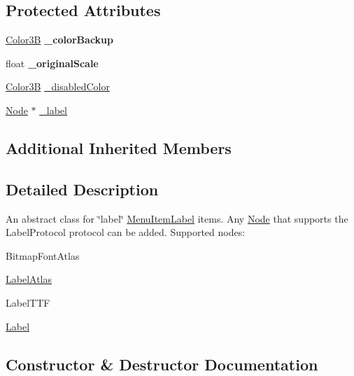 \subsection*{Protected Attributes}
\begin{DoxyCompactItemize}
\item 
\mbox{\label{classMenuItemLabel_ab97fb06ad4110f54b525ab49583ac432}} 
\hyperlink{structColor3B}{Color3B} {\bfseries \+\_\+color\+Backup}
\item 
\mbox{\label{classMenuItemLabel_a2d4891bd7e75002b91a4990b415604ae}} 
float {\bfseries \+\_\+original\+Scale}
\item 
\hyperlink{structColor3B}{Color3B} \hyperlink{classMenuItemLabel_ac7d3fb33f25925a207e2acc15b3b7edd}{\+\_\+disabled\+Color}
\item 
\hyperlink{classNode}{Node} $\ast$ \hyperlink{classMenuItemLabel_a63107854e5ce5d5f177636d905ff46fa}{\+\_\+label}
\end{DoxyCompactItemize}
\subsection*{Additional Inherited Members}


\subsection{Detailed Description}
An abstract class for \char`\"{}label\char`\"{} \hyperlink{classMenuItemLabel}{Menu\+Item\+Label} items. Any \hyperlink{classNode}{Node} that supports the Label\+Protocol protocol can be added. Supported nodes\+: 


\begin{DoxyItemize}
\item Bitmap\+Font\+Atlas
\item \hyperlink{classLabelAtlas}{Label\+Atlas}
\item Label\+T\+TF
\item \hyperlink{classLabel}{Label} 
\end{DoxyItemize}

\subsection{Constructor \& Destructor Documentation}
\mbox{\label{classMenuItemLabel_a69e2f0041f22e640b74ce001d9ba00c2}} 
